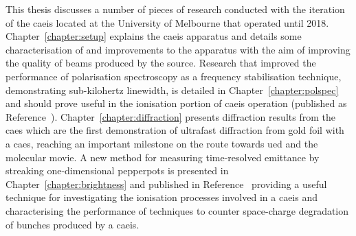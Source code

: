 This thesis discusses a number of pieces of research conducted with the iteration of the \gls{caeis} located at the University of Melbourne that operated until 2018.
Chapter~\ref{chapter:setup} explains the \gls{caeis} apparatus and details some characterisation of and improvements to the apparatus with the aim of improving the quality of beams produced by the source.
Research that improved the performance of polarisation spectroscopy as a frequency stabilisation technique, demonstrating sub-kilohertz linewidth, is detailed in Chapter~\ref{chapter:polspec} and should prove useful in the ionisation portion of \gls{caeis} operation (published as Reference~\cite{torrance_sub-kilohertz_2016}).
Chapter~\ref{chapter:diffraction} presents diffraction results from the \gls{caes} which are the first demonstration of ultrafast diffraction from gold foil with a \gls{caes}, reaching an important milestone on the route towards \gls{ued} and the molecular movie.
A new method for measuring time-resolved emittance by streaking one-dimensional pepperpots is presented in Chapter~\ref{chapter:brightness} and published in Reference~\cite{torrance_time-resolved_2018} providing a useful technique for investigating the ionisation processes involved in a \gls{caeis} and characterising the performance of techniques to counter space-charge degradation of bunches produced by a \gls{caeis}.
